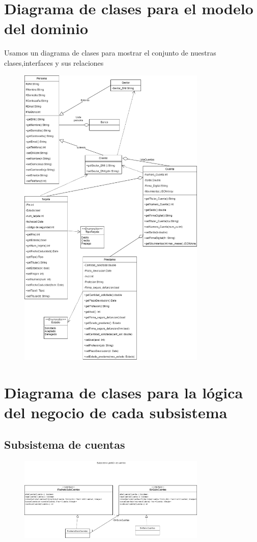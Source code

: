 \documentclass[12pt]{article}
\begin{document}
\section{Diagrama de clases para el modelo del dominio}
Usamos un diagrama de clases para mostrar el conjunto de nuestras clases,interfaces y sus relaciones
\begin{figure}[H]
    \centering
    \includegraphics[width=0.8\textwidth]{images/Diagrama_de_clases.png}
\end{figure}

\newpage
\section{Diagrama de clases para la lógica del negocio de cada subsistema}
\subsection{Subsistema de cuentas}
\begin{figure}[H]
    \centering
    \includegraphics[width=0.8\textwidth]{images/SubsCuentas.png}
\end{figure}
\end{document}

